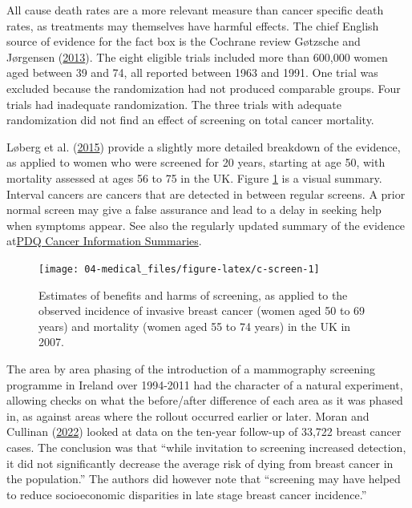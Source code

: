 \documentclass[
  10pt,
  b5paper]{book}
\begin{document}
All cause death rates are a more relevant measure than cancer specific
death rates, as treatments may themselves have harmful effects.
The chief English source of evidence for the fact box is the Cochrane
review Gøtzsche and Jørgensen (\protect\hyperlink{ref-gotzsche2013screening}{2013}). The eight eligible trials included more
than 600,000 women aged between 39 and 74, all reported between 1963 and 1991. One trial was excluded because the randomization had not produced
comparable groups. Four trials had inadequate randomization. The three
trials with adequate randomization did not find an effect of screening on
total cancer mortality.

Løberg et al. (\protect\hyperlink{ref-loberg2015benefits}{2015}) provide a slightly more detailed breakdown of the
evidence, as applied to women who were screened for 20 years, starting
at age 50, with mortality assessed at ages 56 to 75 in the UK. Figure
\ref{fig:c-screen} is a visual summary. Interval cancers are cancers
that are detected in between regular screens. A prior normal screen may
give a false assurance and lead to a delay in seeking help when symptoms
appear. See also the regularly updated summary of the evidence at\href{https://www.ncbi.nlm.nih.gov/books/NBK65906/}{PDQ Cancer Information Summaries}.

\begin{figure}[H]

{\centering \texttt{[image: 04-medical\_files/figure-latex/c-screen-1]} 

}

\caption{Estimates of benefits and harms of screening, as applied to the observed incidence of invasive breast cancer (women aged 50 to 69 years) and mortality (women aged 55 to 74 years) in the UK in 2007.}\label{fig:c-screen}
\end{figure}

The area by area phasing of the introduction of a mammography
screening programme in Ireland over 1994-2011 had the
character of a natural experiment, allowing checks on what
the before/after difference of each area as it was phased in,
as against areas where the rollout occurred earlier or later.
Moran and Cullinan (\protect\hyperlink{ref-MORAN2022115073}{2022}) looked at data on the ten-year follow-up of
33,722 breast cancer cases. The conclusion was that
``while invitation to screening increased detection, it did not
significantly decrease the average risk of dying from breast
cancer in the population.'' The authors did however note that
``screening may have helped to reduce socioeconomic disparities
in late stage breast cancer incidence.''
\end{document}

